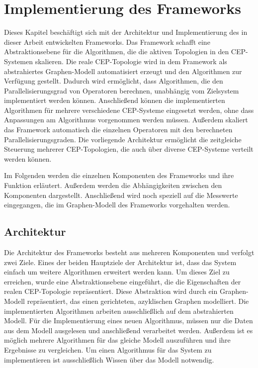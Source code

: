 \chapter{Implementierung des Frameworks}

Dieses Kapitel beschäftigt sich mit der Architektur und Implementierung des in dieser Arbeit entwickelten Frameworks.
Das Framework schafft eine Abstraktionsebene für die Algorithmen, die die aktiven Topologien in den CEP-Systemen skalieren.
Die reale CEP-Topologie wird in dem Framework als abstrahiertes Graphen-Modell automatisiert erzeugt und den Algorithmen zur Verfügung gestellt.
Dadurch wird ermöglicht, dass Algorithmen, die den Parallelisierungsgrad von Operatoren berechnen, unabhängig vom Zielsystem implementiert werden können.
Anschließend können die implementierten Algorithmen für mehrere verschiedene CEP-Systeme eingesetzt werden, ohne dass Anpassungen am Algorithmus vorgenommen werden müssen.
Außerdem skaliert das Framework automatisch die einzelnen Operatoren mit den berechneten Parallelisierungsgraden.
Die vorliegende Architektur ermöglicht die zeitgleiche Steuerung mehrerer CEP-Topologien, die auch über diverse CEP-Systeme verteilt werden können.

Im Folgenden werden die einzelnen Komponenten des Frameworks und ihre Funktion erläutert.
Außerdem werden die Abhängigkeiten zwischen den Komponenten dargestellt.
Anschließend wird noch speziell auf die Messwerte eingegangen, die im Graphen-Modell des Frameworks vorgehalten werden.
 

\section{Architektur}

Die Architektur des Frameworks besteht aus mehreren Komponenten und verfolgt zwei Ziele.
Eines der beiden Hauptziele der Architektur ist, dass das System einfach um weitere Algorithmen erweitert werden kann.
Um dieses Ziel zu erreichen, wurde eine Abstraktionsebene eingeführt, die die Eigenschaften der realen CEP-Topologie repräsentiert.
Diese Abstraktion wird durch ein Graphen-Modell repräsentiert, das einen gerichteten, azyklischen Graphen modelliert.
Die implementierten Algorithmen arbeiten ausschließlich auf dem abstrahierten Modell.
Für die Implementierung eines neuen Algorithmus, müssen nur die Daten aus dem Modell ausgelesen und anschließend verarbeitet werden.
Außerdem ist es möglich mehrere Algorithmen für das gleiche Modell auszuführen und ihre Ergebnisse zu vergleichen.
Um einen Algorithmus für das System zu implementieren ist ausschließlich Wissen über das Modell notwendig.


